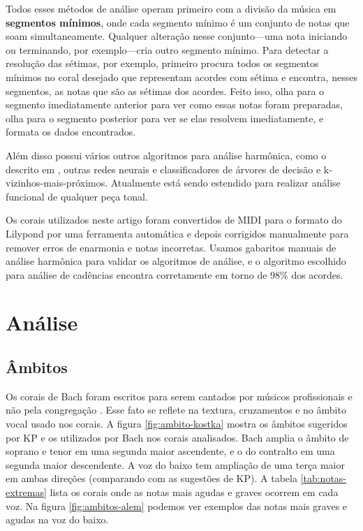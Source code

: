 Todos esses métodos de análise operam primeiro com a divisão da música
em \textbf{segmentos mínimos}, onde cada segmento mínimo é um conjunto
de notas que soam simultaneamente. Qualquer alteração nesse
conjunto---uma nota iniciando ou terminando, por exemplo---cria outro
segmento mínimo. Para detectar a resolução das sétimas, por exemplo,
\rameau{} primeiro procura todos os segmentos mínimos no coral
desejado que representam acordes com sétima e encontra, nesses
segmentos, as notas que são as sétimas dos acordes. Feito isso,
\rameau{} olha para o segmento imediatamente anterior para ver como
essas notas foram preparadas, olha para o segmento posterior para ver
se elas resolvem imediatamente, e formata os dados encontrados.

Além disso \rameau{} possui vários outros algoritmos para análise
harmônica, como o descrito em \cite{pardo.ea00:automated}, outras
redes neurais e classificadores de árvores de decisão e
k-vizinhos-mais-próximos. Atualmente \rameau{} está sendo estendido
para realizar análise funcional de qualquer peça tonal.

Os corais utilizados neste artigo foram convertidos de MIDI para o
formato do Lilypond por uma ferramenta automática e depois corrigidos
manualmente para remover erros de enarmonia e notas incorretas. Usamos
gabaritos manuais de análise harmônica para validar os algoritmos de
análise, e o algoritmo escolhido para análise de cadências encontra
corretamente em torno de 98\% dos acordes.

\section{Análise}
\label{sec:analise}

\subsection{Âmbitos}
\label{sec:ambitos}

Os corais de Bach foram escritos para serem cantados por músicos
profissionais e não pela congregação \cite{bach41:371}. Esse fato se
reflete na textura, cruzamentos e no âmbito vocal usado nos corais. A
figura \ref{fig:ambito-kostka} mostra os âmbitos sugeridos por KP e os
utilizados por Bach nos corais analisados. Bach amplia o âmbito de
soprano e tenor em uma segunda maior ascendente, e o do contralto em
uma segunda maior descendente. A voz do baixo tem ampliação de uma
terça maior em ambas direções (comparando com as sugestões de KP). A
tabela \ref{tab:notas-extremas} lista os corais onde as notas mais
agudas e graves ocorrem em cada voz. Na figura \ref{fig:ambitos-alem}
podemos ver exemplos das notas mais graves e agudas na voz do baixo.

